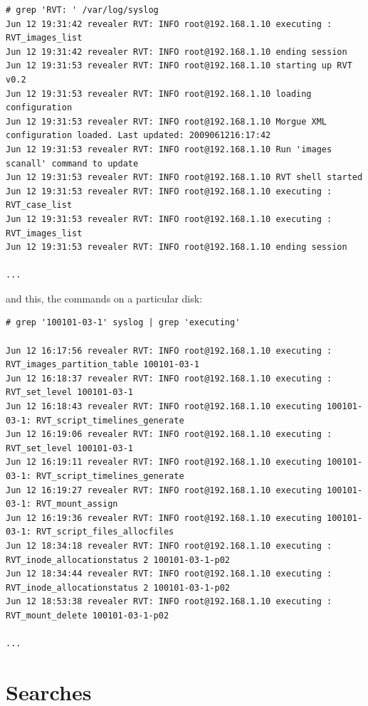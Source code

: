 \documentclass[a4paper,11pt,oneside]{report}
\begin{document}
{ \footnotesize
\begin{verbatim}
# grep 'RVT: ' /var/log/syslog
Jun 12 19:31:42 revealer RVT: INFO root@192.168.1.10 executing : RVT_images_list  
Jun 12 19:31:42 revealer RVT: INFO root@192.168.1.10 ending session 
Jun 12 19:31:53 revealer RVT: INFO root@192.168.1.10 starting up RVT v0.2 
Jun 12 19:31:53 revealer RVT: INFO root@192.168.1.10 loading configuration 
Jun 12 19:31:53 revealer RVT: INFO root@192.168.1.10 Morgue XML configuration loaded. Last updated: 2009061216:17:42 
Jun 12 19:31:53 revealer RVT: INFO root@192.168.1.10 Run 'images scanall' command to update 
Jun 12 19:31:53 revealer RVT: INFO root@192.168.1.10 RVT shell started 
Jun 12 19:31:53 revealer RVT: INFO root@192.168.1.10 executing : RVT_case_list  
Jun 12 19:31:53 revealer RVT: INFO root@192.168.1.10 executing : RVT_images_list  
Jun 12 19:31:53 revealer RVT: INFO root@192.168.1.10 ending session 

...
\end{verbatim}
}

and this, the commands on a particular disk:

{ \footnotesize
\begin{verbatim}
# grep '100101-03-1' syslog | grep 'executing'

Jun 12 16:17:56 revealer RVT: INFO root@192.168.1.10 executing : RVT_images_partition_table 100101-03-1 
Jun 12 16:18:37 revealer RVT: INFO root@192.168.1.10 executing : RVT_set_level 100101-03-1 
Jun 12 16:18:43 revealer RVT: INFO root@192.168.1.10 executing 100101-03-1: RVT_script_timelines_generate  
Jun 12 16:19:06 revealer RVT: INFO root@192.168.1.10 executing : RVT_set_level 100101-03-1 
Jun 12 16:19:11 revealer RVT: INFO root@192.168.1.10 executing 100101-03-1: RVT_script_timelines_generate  
Jun 12 16:19:27 revealer RVT: INFO root@192.168.1.10 executing 100101-03-1: RVT_mount_assign  
Jun 12 16:19:36 revealer RVT: INFO root@192.168.1.10 executing 100101-03-1: RVT_script_files_allocfiles  
Jun 12 18:34:18 revealer RVT: INFO root@192.168.1.10 executing : RVT_inode_allocationstatus 2 100101-03-1-p02 
Jun 12 18:34:44 revealer RVT: INFO root@192.168.1.10 executing : RVT_inode_allocationstatus 2 100101-03-1-p02 
Jun 12 18:53:38 revealer RVT: INFO root@192.168.1.10 executing : RVT_mount_delete 100101-03-1-p02

...
\end{verbatim}
}



\section{Searches} \label{anx:searches}
\end{document}
